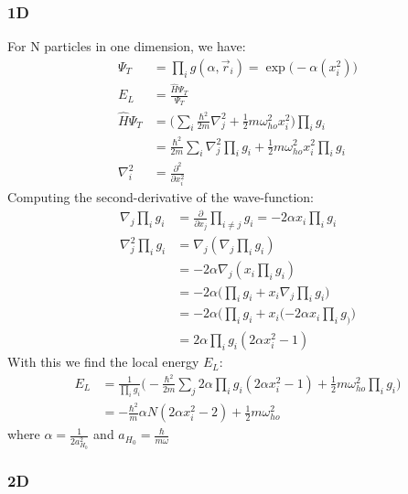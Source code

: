 \documentclass[12pt]{article}
\newcommand{\f}[2]{\frac{#1}{#2}}
\newcommand{\op}[1]{\widehat{#1}}
\newcommand{\pp}[1]{\frac{\partial}{\partial #1}}
\newcommand{\ppn}[1]{\frac{\partial^2}{\partial #1^2}}
\begin{document}
\subsubsection{1D}
For N particles in one dimension, we have:
\begin{align*}
	\Psi_T &= \prod_{i} g(\alpha, \vec{r}_i) = \exp\big(-\alpha(x^{2}_i)\big) \\
	E_L &= \f{\op{H}\Psi_T}{\Psi_T} \\
	\op{H}\Psi_T &= \big(\sum_{i} \f{\hbar^2}{2m}\nabla^{2}_j + 
	\f{1}{2}m\omega^{2}_{ho}x^{2}_i \big) \prod_{i} g_i \\
	&= \f{\hbar^2}{2m}\sum_{i} \nabla^{2}_j \prod_{i} g_i + 
	\f{1}{2}m\omega^{2}_{ho}x^{2}_i \prod_{i} g_i \\
	\nabla^{2}_i &= \ppn{x_i}
\end{align*}
Computing the second-derivative of the wave-function:
\begin{align*}
	\nabla_j \prod_{i}g_i &=\pp{x_j}\prod_{i\neq j}g_i = -2\alpha x_i\prod_{i} g_i \\
	\nabla^{2}_j\prod_{i}g_i &= \nabla_j(\nabla_j \prod_{i}g_i) \\
	&= -2\alpha \nabla_j(x_i\prod_{i} g_i) \\
	&= -2\alpha \big(\prod_{i}g_i + x_i\nabla_j\prod_{i}g_i \big) \\
	&= -2\alpha \big(\prod_{i}g_i + x_i(-2\alpha x_i \prod_{i}g_)\big) \\
	&= 2\alpha\prod_{i}g_i(2\alpha x^{2}_i - 1)
\end{align*}
With this we find the local energy $E_L$:
\begin{align*}
	E_L &= 
	\f{1}{\prod_{i}g_i}\big(-\f{\hbar^2}{2m}\sum_{j}2\alpha\prod_{i}g_i
	(2\alpha x^{2}_i - 1) + \f{1}{2}m\omega^{2}_{ho}\prod_{i}g_i \big) \\
	&= -\f{\hbar^2}{m}\alpha N(2\alpha x^{2}_i - 2) + \f{1}{2}m\omega^{2}_{ho}
\end{align*}
where $\alpha = \f{1}{2a^{2}_{H_0}}$ and $a_{H_0} = \f{\hbar}{m\omega}$

\subsubsection{2D}
\end{document}
